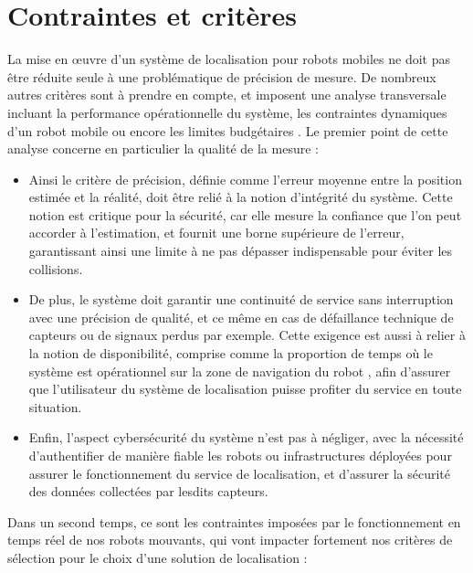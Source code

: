 \documentclass[11pt, a4paper]{article}
\begin{document}
\section{Contraintes et critères}

La mise en œuvre d’un système de localisation pour robots mobiles ne doit pas être réduite seule à une problématique de précision de mesure. De nombreux autres critères sont à prendre en compte, et imposent une analyse transversale incluant la performance opérationnelle du système, les contraintes dynamiques d’un robot mobile ou encore les limites budgétaires \cite{retscherIndoorNavigationUser2022}. Le premier point de cette analyse concerne en particulier la qualité de la mesure :

\begin{itemize}
	\item Ainsi le critère de précision, définie comme l’erreur moyenne entre la position estimée et la réalité, doit être relié à la notion d’intégrité du système. Cette notion est critique pour la sécurité, car elle mesure la confiance que l’on peut accorder à l’estimation, et fournit une borne supérieure de l’erreur, garantissant ainsi une limite à ne pas dépasser indispensable pour éviter les collisions. 
	\item De plus, le système doit garantir une continuité de service sans interruption avec une précision de qualité, et ce même en cas de défaillance technique de capteurs ou de signaux perdus par exemple. Cette exigence est aussi à relier à la notion de disponibilité, comprise comme la proportion de temps où le système est opérationnel sur la zone de navigation du robot , afin d’assurer que l’utilisateur du système de localisation puisse profiter du service en toute situation.
	\item Enfin, l’aspect cybersécurité du système n’est pas à négliger, avec la nécessité d'authentifier de manière fiable les robots ou infrastructures déployées pour assurer le fonctionnement du service de localisation, et d’assurer la sécurité des données collectées par lesdits capteurs.
\end{itemize}

Dans un second temps, ce sont les contraintes imposées par le fonctionnement en temps réel de nos robots mouvants, qui vont impacter fortement nos critères de sélection pour le choix d’une solution de localisation : 
\end{document}
